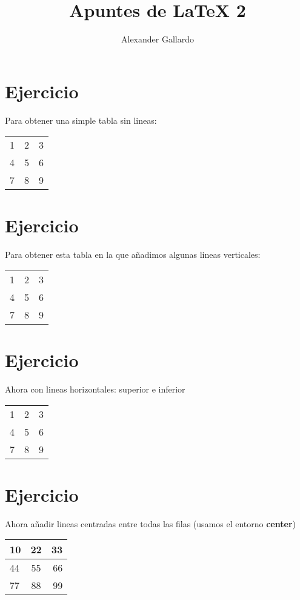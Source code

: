 \documentclass[11pt,legalpaper]{article}
\author{Alexander Gallardo}
\title{Apuntes de \LaTeX{} 2}
\date{}
\begin{document}
	\maketitle
	\begin{flushleft}%
		\section{Ejercicio} %
			Para obtener una simple tabla sin lineas:
			\begin{center}%
				\begin{tabular}{l c r}
					1 & 2 & 3\\
					4 & 5 & 6\\
					7 & 8 & 9\\	
				\end{tabular}
			\end{center}
		\section{Ejercicio}
		 Para obtener esta tabla en la que añadimos algunas lineas verticales:\\
			\begin{center}
				\begin{tabular}{l| c|| r|}
					1 & 2 & 3\\
					4 & 5 & 6\\
					7 & 8 & 9\\	
				\end{tabular}
			\end{center}
		\section{Ejercicio}
		Ahora con lineas horizontales: superior e inferior\\
			\begin{center}
				\begin{tabular}{l| c|| r|}
					\hline
						1 & 2 & 3\\
						4 & 5 & 6\\
						7 & 8 & 9\\
					\hline	
				\end{tabular}
			\end{center}
		\section{Ejercicio}
		Ahora añadir lineas centradas entre todas las filas (usamos el entorno \textbf{center})
			\begin{center}
				\begin{tabular}{l| c|| r|}
					\hline
					10 & 22 & 33\\ \hline
					44 & 55 & 66\\ \hline
					77 & 88 & 99\\
					\hline	
				\end{tabular}
			\end{center}
	\end{flushleft}
\end{document}
